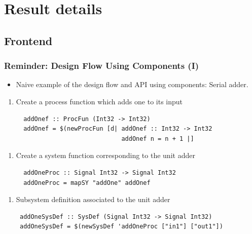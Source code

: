 \documentclass{beamer}
\begin{document}
\section{Result details}

\subsection{Frontend}

\begin{frame}[fragile]
  \frametitle{Reminder: Design Flow Using Components (I)}
  \begin{itemize}
  \item
    Naive example of the design flow and API using components: Serial adder.
  \end{itemize}
  
  
  \vspace{-0.7cm}
  \begin{overprint}
   \begin{enumerate}[1)]
   \item Create a process function which adds one to its input 
    \begin{lstlisting}
  addOnef :: ProcFun (Int32 -> Int32)
  addOnef = $(newProcFun [d| addOnef :: Int32 -> Int32 
                             addOnef n = n + 1 |]
    \end{lstlisting}
    \end{enumerate}
   
   \begin{enumerate}[2)]
   \item Create a system function corresponding to the unit adder
   \begin{lstlisting}
  addOneProc :: Signal Int32 -> Signal Int32
  addOneProc = mapSY "addOne" addOnef
   \end{lstlisting}
   \end{enumerate}
   
   \begin{enumerate}[3)]
   \item Subsystem definition associated to the unit adder
   \begin{lstlisting}
 addOneSysDef :: SysDef (Signal Int32 -> Signal Int32)
 addOneSysDef = $(newSysDef 'addOneProc ["in1"] ["out1"])
   \end{lstlisting}
   \end{enumerate}



\end{overprint}
\end{frame}
\end{document}
